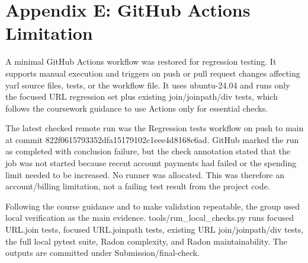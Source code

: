 \documentclass[11pt,a4paper]{article}
\begin{document}
\section*{Appendix E: GitHub Actions Limitation}


A minimal GitHub Actions workflow was restored for regression testing. It supports manual execution and triggers on push or pull request changes affecting yarl source files, tests, or the workflow file. It uses ubuntu-24.04 and runs only the focused URL regression set plus existing join/joinpath/div tests, which follows the coursework guidance to use Actions only for essential checks.


The latest checked remote run was the Regression tests workflow on push to main at commit 822f0615793352dfa15179102c1eee4d8168c6ad. GitHub marked the run as completed with conclusion failure, but the check annotation stated that the job was not started because recent account payments had failed or the spending limit needed to be increased. No runner was allocated. This was therefore an account/billing limitation, not a failing test result from the project code.


Following the course guidance and to make validation repeatable, the group used local verification as the main evidence. tools/run\_local\_checks.py runs focused URL.join tests, focused URL.joinpath tests, existing URL join/joinpath/div tests, the full local pytest suite, Radon complexity, and Radon maintainability. The outputs are committed under Submission/final-check.
\end{document}
